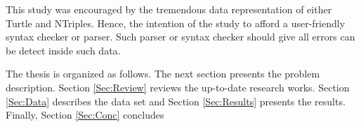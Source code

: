 \vspace{5mm} %

This study was encouraged by the tremendous data representation of either Turtle and NTriples. Hence, the intention of the study to afford a user-friendly syntax checker or parser. Such parser or syntax checker should give all errors can be detect inside such data.

\vspace{5mm} %


The thesis is organized as follows. The next section presents the
problem description. Section \ref{Sec:Review} reviews the up-to-date research works. Section \ref{Sec:Data} describes the data set
and Section \ref{Sec:Results} presents the results. Finally, Section
\ref{Sec:Conc} concludes